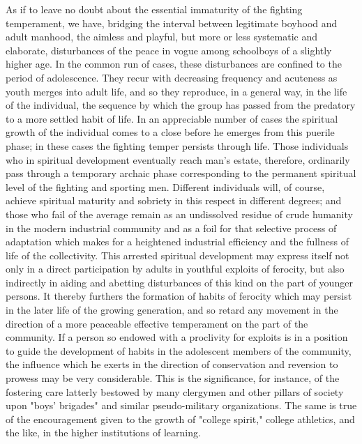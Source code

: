 \documentclass[12pt]{report}
\begin{document}
As if to leave no doubt about the essential immaturity of the fighting
temperament, we have, bridging the interval between legitimate boyhood
and adult manhood, the aimless and playful, but more or less systematic
and elaborate, disturbances of the peace in vogue among schoolboys of a
slightly higher age. In the common run of cases, these disturbances
are confined to the period of adolescence. They recur with decreasing
frequency and acuteness as youth merges into adult life, and so they
reproduce, in a general way, in the life of the individual, the sequence
by which the group has passed from the predatory to a more settled habit
of life. In an appreciable number of cases the spiritual growth of the
individual comes to a close before he emerges from this puerile
phase; in these cases the fighting temper persists through life. Those
individuals who in spiritual development eventually reach man's
estate, therefore, ordinarily pass through a temporary archaic phase
corresponding to the permanent spiritual level of the fighting and
sporting men. Different individuals will, of course, achieve spiritual
maturity and sobriety in this respect in different degrees; and those
who fail of the average remain as an undissolved residue of crude
humanity in the modern industrial community and as a foil for that
selective process of adaptation which makes for a heightened industrial
efficiency and the fullness of life of the collectivity. This
arrested spiritual development may express itself not only in a direct
participation by adults in youthful exploits of ferocity, but also
indirectly in aiding and abetting disturbances of this kind on the
part of younger persons. It thereby furthers the formation of habits of
ferocity which may persist in the later life of the growing generation,
and so retard any movement in the direction of a more peaceable
effective temperament on the part of the community. If a person so
endowed with a proclivity for exploits is in a position to guide the
development of habits in the adolescent members of the community, the
influence which he exerts in the direction of conservation and reversion
to prowess may be very considerable. This is the significance, for
instance, of the fostering care latterly bestowed by many clergymen
and other pillars of society upon "boys' brigades" and similar
pseudo-military organizations. The same is true of the encouragement
given to the growth of "college spirit," college athletics, and the
like, in the higher institutions of learning.
\end{document}
